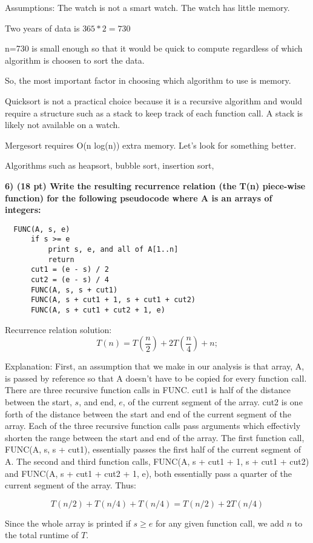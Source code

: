 \documentclass[12pt, a4paper]{article}
\begin{document}
Assumptions: The watch is not a smart watch. The watch has little memory. 

Two years of data is $ 365 * 2 = 730 $

n=730 is small enough so that it would be quick to compute regardless of which algorithm 
is choosen to sort the data. 

So, the most important factor in choosing which algorithm to use is memory. 

Quicksort is not a practical choice because it is a recursive algorithm and would 
require a structure such as a stack to keep track of each function call. A stack is likely 
not available on a watch. 

Mergesort requires O(n log(n)) extra memory. Let's look for something better. 

Algorithms such as heapsort, bubble sort, insertion sort, 

\newpage
\textbf{6) (18 pt) Write the resulting recurrence relation (the T(n) piece-wise function) for the
following pseudocode where A is an arrays of integers: } \\

\begin{lstlisting}
  FUNC(A, s, e)
      if s >= e
          print s, e, and all of A[1..n]
          return
      cut1 = (e - s) / 2
      cut2 = (e - s) / 4
      FUNC(A, s, s + cut1)
      FUNC(A, s + cut1 + 1, s + cut1 + cut2)
      FUNC(A, s + cut1 + cut2 + 1, e)
\end{lstlisting} 

Recurrence relation solution: 
\[
  T(n) = T \left( \frac{n}{2} \right) + 2T \left( \frac{n}{4} \right) + n;
\]

Explanation: First, an assumption that we make in our analysis is that
array, A, is passed by reference so that A doesn't have to be copied 
for every function call. 
There are three recursive function calls in FUNC. 
cut1 is half of the distance between the start, $s$, and end, $e$, of the current segment 
of the array. cut2 is one forth of the distance between the start and end
of the current segment of the array.
Each of the three recursive function calls pass arguments which effectivly shorten the range 
between the start and end of the array.
The first function call, FUNC(A, s, s + cut1), essentially passes the first half of the current
segment of A.  
The second and third function calls, FUNC(A, s + cut1 + 1, s + cut1 + cut2) and 
FUNC(A, s + cut1 + cut2 + 1, e), both essentially pass a quarter of the current segment of 
the array.
Thus: 

\[ 
  T(n/2) + T(n/4) + T(n/4) = T(n/2) + 2T(n/4)
\]

Since the whole array is printed if $ s \geq e $ for any given function call, we add $ n $ to the total runtime 
of $T$.
\end{document}
